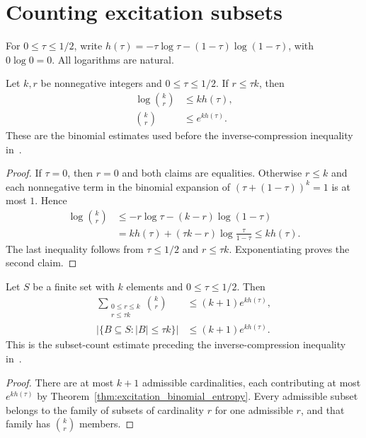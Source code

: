 \section{Counting excitation subsets}

For $0\le\tau\le1/2$, write
$h(\tau)=-\tau\log\tau-(1-\tau)\log(1-\tau)$, with $0\log0=0$.
All logarithms are natural.

\begin{theorem}
    \label{thm:excitation_binomial_entropy}
    \leanok
    Let $k,r$ be nonnegative integers and $0\le\tau\le1/2$.
    If $r\le\tau k$, then
    \begin{align}
        \log\binom{k}{r}&\le kh(\tau),\\
        \binom{k}{r}&\le e^{kh(\tau)}.
    \end{align}
    These are the binomial estimates used before the inverse-compression
    inequality in~\cite[Section~7]{OpenAI2026AreaLaw}.
\end{theorem}

\begin{proof}\leanok
    If $\tau=0$, then $r=0$ and both claims are equalities.
    Otherwise $r\le k$ and each nonnegative term in the binomial expansion
    of $(\tau+(1-\tau))^k=1$ is at most $1$. Hence
    \begin{align}
        \log\binom{k}{r}
        &\le-r\log\tau-(k-r)\log(1-\tau)\\
        &=kh(\tau)+(\tau k-r)\log\frac{\tau}{1-\tau}
        \le kh(\tau).
    \end{align}
    The last inequality follows from $\tau\le1/2$ and $r\le\tau k$.
    Exponentiating proves the second claim.
\end{proof}

\begin{theorem}
    \label{thm:excitation_subset_entropy}
    \leanok
    Let $S$ be a finite set with $k$ elements and $0\le\tau\le1/2$.
    Then
    \begin{align}
        \sum_{\substack{0\le r\le k\\r\le\tau k}}\binom{k}{r}
        &\le(k+1)e^{kh(\tau)},\\
        \bigl|\{B\subseteq S:|B|\le\tau k\}\bigr|
        &\le(k+1)e^{kh(\tau)}.
    \end{align}
    This is the subset-count estimate preceding the inverse-compression
    inequality in~\cite[Section~7]{OpenAI2026AreaLaw}.
\end{theorem}

\begin{proof}\leanok
    There are at most $k+1$ admissible cardinalities, each contributing at
    most $e^{kh(\tau)}$ by Theorem~\ref{thm:excitation_binomial_entropy}.
    Every admissible subset belongs to the family of subsets of cardinality
    $r$ for one admissible $r$, and that family has $\binom{k}{r}$ members.
\end{proof}
